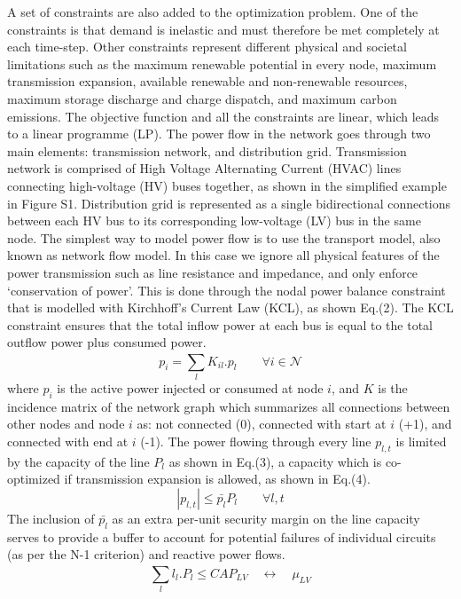 A set of constraints are also added to the optimization problem. One of the constraints is that demand is inelastic and must therefore be met completely at each time-step. Other constraints represent different physical and societal limitations such as the maximum renewable potential in every node, maximum transmission expansion, available renewable and non-renewable resources, maximum storage discharge and charge dispatch, and maximum carbon emissions. The objective function and all the constraints are linear, which leads to a linear programme (LP). 
The power flow in the network goes through two main elements: transmission network, and distribution grid. 
Transmission network is comprised of High Voltage Alternating Current (HVAC) lines connecting high-voltage (HV) buses together, as shown in the simplified example in Figure S1. Distribution grid is represented as a single bidirectional connections between each HV bus to its corresponding low-voltage (LV) bus in the same node. 
The simplest way to model power flow is to use the transport model, also known as network flow model. In this case we ignore all physical features of the power transmission such as line resistance and impedance, and only enforce ‘conservation of power’. This is done through the nodal power balance constraint that is modelled with Kirchhoff’s Current Law (KCL), as shown Eq.(2). The KCL constraint ensures that the total inflow power at each bus is equal to the total outflow power plus consumed power.
\begin{equation}
p_{i} = \sum_{l}^{} K_{il}.p_{l}   \quad\quad   \forall i \in \mathcal{N}
\end{equation}
where \(p_{i}\) is the active power injected or consumed at node \(i\), and \(K\) is the incidence matrix of the network graph which summarizes all connections between other nodes and node \(i\) as: not connected (0), connected with start at \(i\) (+1), and connected with end at \(i\) (-1). The power flowing through every line \(p_{l,t}\) is limited by the capacity of the line \(P_{l}\) as shown in Eq.(3), a capacity which is co-optimized if transmission expansion is allowed, as shown in Eq.(4).
\begin{equation}
\left| p_{l,t}  \right|\le \bar{p_{l}}P_{l} \quad\quad   \forall l,t
\end{equation}
The inclusion of  \(\bar{p_{l}}\) as an extra per-unit security margin on the line capacity serves to provide a buffer to account for potential failures of individual circuits (as per the N-1 criterion) and reactive power flows. 
\begin{equation}
\sum_{l}^{} l_{l}.P_{l}\le CAP_{LV} \quad\leftrightarrow \quad\mu_{LV}
\end{equation}

